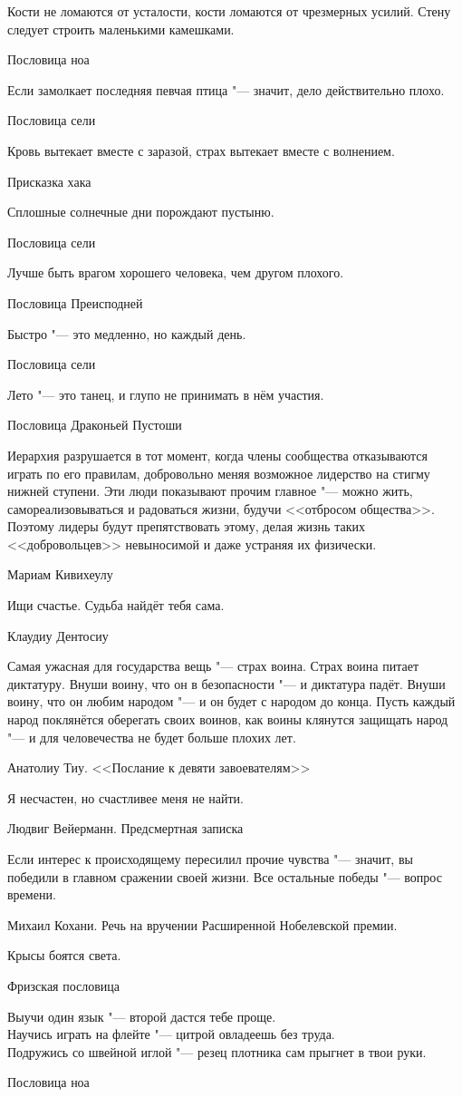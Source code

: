 \epigraph
{Кости не ломаются от усталости, кости ломаются от чрезмерных усилий.
Стену следует строить маленькими камешками.}
{Пословица ноа}

\epigraph
{Если замолкает последняя певчая птица "--- значит, дело действительно плохо.}
{Пословица сели}

\epigraph
{Кровь вытекает вместе с заразой, страх вытекает вместе с волнением.}
{Присказка хака}

\epigraph
{Сплошные солнечные дни порождают пустыню.}
{Пословица сели}

\epigraph
{Лучше быть врагом хорошего человека, чем другом плохого.}
{Пословица Преисподней}

\epigraph
{Быстро "--- это медленно, но каждый день.}
{Пословица сели}

\epigraph
{Лето "--- это танец, и глупо не принимать в нём участия.}
{Пословица Драконьей Пустоши}

\epigraph
{Иерархия разрушается в тот момент, когда члены сообщества отказываются играть по его правилам, добровольно меняя возможное лидерство на стигму нижней ступени.
Эти люди показывают прочим главное "--- можно жить, самореализовываться и радоваться жизни, будучи <<отбросом общества>>.
Поэтому лидеры будут препятствовать этому, делая жизнь таких <<добровольцев>> невыносимой и даже устраняя их физически.}
{Мариам Кивихеулу}

\epigraph
{Ищи счастье.
Судьба найдёт тебя сама.}
{Клаудиу Дентосиу}

\epigraph
{Самая ужасная для государства вещь "--- страх воина.
Страх воина питает диктатуру.
Внуши воину, что он в безопасности "--- и диктатура падёт.
Внуши воину, что он любим народом "--- и он будет с народом до конца.
Пусть каждый народ поклянётся оберегать своих воинов, как воины клянутся защищать народ "--- и для человечества не будет больше плохих лет.}
{Анатолиу Тиу.
<<Послание к девяти завоевателям>>}

\epigraph
{Я несчастен, но счастливее меня не найти.}
{Людвиг Вейерманн.
Предсмертная записка}

\epigraph
{Если интерес к происходящему пересилил прочие чувства "--- значит, вы победили в главном сражении своей жизни.
Все остальные победы "--- вопрос времени.}
{Михаил Кохани.
Речь на вручении Расширенной Нобелевской премии.}

\epigraph
{Крысы боятся света.}
{Фризская пословица}

\epigraph
{Выучи один язык "--- второй дастся тебе проще.\\
Научись играть на флейте "--- цитрой овладеешь без труда.\\
Подружись со швейной иглой "--- резец плотника сам прыгнет в твои руки.}
{Пословица ноа}

